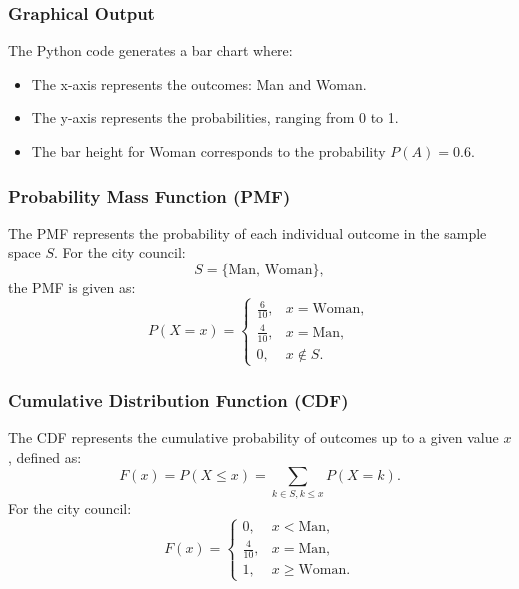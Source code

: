 \documentclass{beamer}
\begin{document}
\begin{frame}
\frametitle{Graphical Output}
The Python code generates a bar chart where:
\begin{itemize}
    \item The x-axis represents the outcomes: Man and Woman.
    \item The y-axis represents the probabilities, ranging from 0 to 1.
    \item The bar height for Woman corresponds to the probability \(P(A) = 0.6\).
\end{itemize}
\end{frame}

\begin{frame}
\frametitle{Probability Mass Function (PMF)}
The PMF represents the probability of each individual outcome in the sample space \(S\).  
For the city council:
\[
S = \{\text{Man, Woman}\},
\]
the PMF is given as:
\[
P(X = x) = 
\begin{cases} 
\frac{6}{10}, & x = \text{Woman}, \\ 
\frac{4}{10}, & x = \text{Man}, \\ 
0, & x \notin S.
\end{cases}
\]
\end{frame}

\begin{frame}
\frametitle{Cumulative Distribution Function (CDF)}
The CDF represents the cumulative probability of outcomes up to a given value \(x\), defined as:
\[
F(x) = P(X \leq x) = \sum_{k \in S, k \leq x} P(X = k).
\]
For the city council:
\[
F(x) = 
\begin{cases} 
0, & x < \text{Man}, \\ 
\frac{4}{10}, & x = \text{Man}, \\ 
1, & x \geq \text{Woman}.
\end{cases}
\]
\end{frame}
\end{document}
